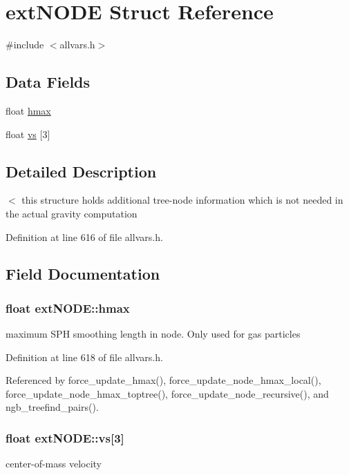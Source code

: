 \hypertarget{structextNODE}{
\section{extNODE Struct Reference}
\label{structextNODE}
}


{\ttfamily \#include $<$allvars.h$>$}

\subsection*{Data Fields}
\begin{DoxyCompactItemize}
\item 
float \hyperlink{structextNODE_ac479dcb30bffad0266b13b9200bbe9ad}{hmax}
\item 
float \hyperlink{structextNODE_a8fe64edf0e8598f60ff0ba73a04261bb}{vs} \mbox{[}3\mbox{]}
\end{DoxyCompactItemize}


\subsection{Detailed Description}
$<$ this structure holds additional tree-\/node information which is not needed in the actual gravity computation 

Definition at line 616 of file allvars.h.



\subsection{Field Documentation}
\hypertarget{structextNODE_ac479dcb30bffad0266b13b9200bbe9ad}{
\subsubsection[{hmax}]{\setlength{\rightskip}{0pt plus 5cm}float {\bf extNODE::hmax}}}
\label{structextNODE_ac479dcb30bffad0266b13b9200bbe9ad}
maximum SPH smoothing length in node. Only used for gas particles 

Definition at line 618 of file allvars.h.



Referenced by force\_\-update\_\-hmax(), force\_\-update\_\-node\_\-hmax\_\-local(), force\_\-update\_\-node\_\-hmax\_\-toptree(), force\_\-update\_\-node\_\-recursive(), and ngb\_\-treefind\_\-pairs().

\hypertarget{structextNODE_a8fe64edf0e8598f60ff0ba73a04261bb}{
\subsubsection[{vs}]{\setlength{\rightskip}{0pt plus 5cm}float {\bf extNODE::vs}\mbox{[}3\mbox{]}}}
\label{structextNODE_a8fe64edf0e8598f60ff0ba73a04261bb}
center-\/of-\/mass velocity 


